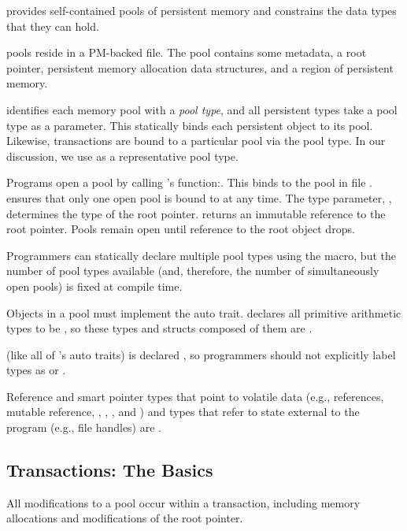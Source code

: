 \This{} provides self-contained pools of persistent memory and constrains the
data types that they can hold.

 \This{} pools reside in a
PM-backed file.  The pool contains some metadata, a root pointer, persistent
memory allocation data structures, and a region of persistent memory.

\This{} identifies each memory pool with a \emph{pool type}, and all persistent
types take a pool type as a parameter.  This statically binds each persistent
object to its pool.  Likewise, transactions are bound to a particular pool via
the pool type.  In our discussion, we use  as a representative pool
type.

Programs open a pool by calling 's  function:\linebreak{}.  This binds  to the pool in file
.  \This{} ensures that only one open pool is bound to  at
any time.  The type parameter, , determines the type of the root
pointer.   returns an immutable reference to the root pointer.  Pools remain
open until reference to the root object drops.

Programmers can statically declare multiple pool types using the
 macro, but the number of pool types available (and,
therefore, the number of simultaneously open pools) is fixed at compile time.

 Objects in a pool must implement the
 auto trait.  \This{} declares all primitive arithmetic types to be
, so these types and structs composed of them are .

 (like all of \this{}'s auto traits) is declared
, so programmers should not explicitly label types as 
or .

Reference and smart pointer types that point to volatile data (e.g.,
references, mutable reference, , , , and
) and types that refer to state external to the program (e.g., file
handles) are .

\subsection{Transactions: The Basics}



All modifications to a \this{} pool occur within a transaction, including
memory allocations and modifications of the root pointer.

